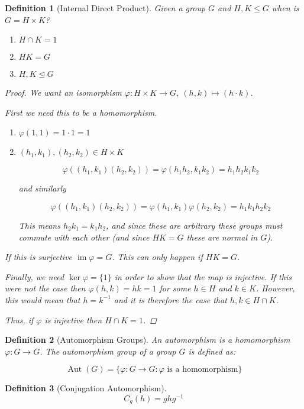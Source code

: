 \documentclass{article}
\newtheorem{mdef}{Definition}
\newcommand{\normal}{\trianglelefteq}
\DeclareMathOperator{\im}{im}
\DeclareMathOperator{\aut}{Aut}
\begin{document}
\begin{mdef}[Internal Direct Product]
  Given a group $G$ and $H, K \leq G$ when is $G = H \times K$?

  \begin{enumerate}
    \item $H \cap K = 1$
    \item $HK = G$
    \item $H, K \normal G$
  \end{enumerate}

  \begin{proof}
    We want an isomorphism $\varphi : H \times K \to G$, $(h, k) \mapsto (h \cdot k)$.

    First we need this to be a homomorphism.

    \begin{enumerate}
    \item $\varphi(1, 1) = 1 \cdot 1 = 1$
    \item $(h_1, k_1), (h_2, k_2) \in H \times K$

      \[\varphi((h_1, k_1)(h_2, k_2)) = \varphi(h_1 h_2, k_1 k_2) = h_1 h_2 k_1 k_2\]

      and similarly

      \[\varphi((h_1, k_1)(h_2, k_2)) = \varphi(h_1, k_1) \varphi(h_2, k_2) = h_1 k_1 h_2 k_2\]

      This means $h_2 k_1 = k_1 h_2$, and since these are arbitrary these groups must commute with each other (and since $HK = G$ these are normal in $G$).
    \end{enumerate}

    If this is surjective  $\im \varphi = G$. This can only happen if $HK = G$.

    Finally, we need $\ker \varphi = \{1\}$ in order to show that the map is injective. If this were not the case then $\varphi(h, k) = h k = 1$ for some $h \in H$ and $k \in K$. However, this would mean that $h = k^{-1}$ and it is therefore the case that $h, k \in H \cap K$.

    Thus, if $\varphi$ is injective then $H \cap K = 1$.
  \end{proof}
\end{mdef}

\begin{mdef}[Automorphism Groups]
  An automorphism is a homomorphism $\varphi : G \to G$. The automorphism group of a group $G$ is defined as:

  \[\aut(G) = \{\varphi : G \to G : \varphi \text{ is a homomorphism}\}\]
\end{mdef}

\begin{mdef}[Conjugation Automorphism]
  \[C_g(h) = g h g^{-1}\]
\end{mdef}
\end{document}
